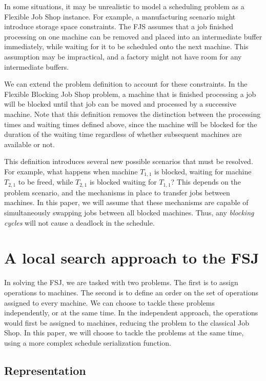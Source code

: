 \documentclass[a4paper,10pt]{article}
\begin{document}
In some situations, it may be unrealistic to model a scheduling problem as a Flexible Job Shop instance. For example, a manufacturing scenario might introduce storage space constraints. The FJS assumes that a job finished processing on one machine can be removed and placed into an intermediate buffer immediately, while waiting for it to be scheduled onto the next machine. This assumption may be impractical, and a factory might not have room for any intermediate buffers.

We can extend the problem definition to account for these constraints. In the Flexible Blocking Job Shop problem, a machine that is finished processing a job will be blocked until that job can be moved and processed by a successive machine. Note that this definition removes the distinction between the processing times and waiting times defined above, since the machine will be blocked for the duration of the waiting time regardless of whether subsequent machines are available or not.

This definition introduces several new possible scenarios that must be resolved. For example, what happens when machine $T_{1,1}$ is blocked, waiting for machine $T_{2,1}$ to be freed, while $T_{2,1}$ is blocked waiting for $T_{1,1}$? This depends on the problem scenario, and the mechanisms in place to transfer jobs between machines. In this paper, we will assume that these mechanisms are capable of simultaneously swapping jobs between all blocked machines. Thus, any \emph{blocking cycles} will not cause a deadlock in the schedule.

\section{A local search approach to the FSJ}

In solving the FSJ, we are tasked with two problems. The first is to assign operations to machines. The second is to define an order on the set of operations assigned to every machine. We can choose to tackle these problems independently, or at the same time. In the independent approach, the operations would first be assigned to machines, reducing the problem to the classical Job Shop. In this paper, we will choose to tackle the problems at the same time, using a more complex schedule serialization function.

\subsection{Representation}
\end{document}
